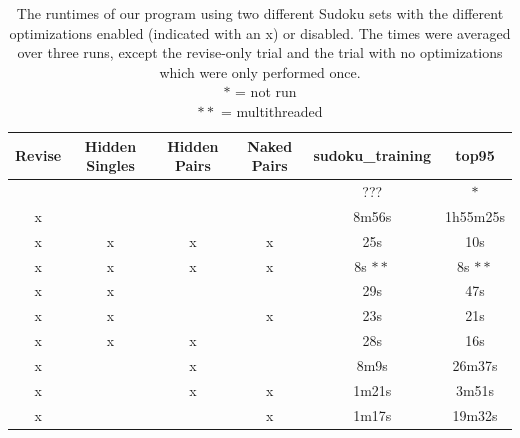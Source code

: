 \documentclass[11pt]{article} %
\begin{document}
\begin{table}[htbp]
\begin{center}
\begin{tabular}{c c c c c c}
\hline
 Revise & Hidden Singles & Hidden Pairs & Naked Pairs & sudoku\_training & top95 \\
\hline
 &  &  &  & ??? & $*$ \\ %
x &  &  &  & 8m56s & 1h55m25s \\ %
x & x & x & x & 25s & 10s \\ %
x & x & x & x & 8s $**$ & 8s $**$ \\
x & x &  &  & 29s & 47s \\ %
x & x &  & x & 23s & 21s \\ %
x & x & x &  & 28s & 16s \\ %
x &   & x &  & 8m9s & 26m37s \\ %
x &   & x & x & 1m21s & 3m51s \\ %
x &  &  & x & 1m17s & 19m32s \\ %
\hline
\end{tabular}
\end{center}
\caption{The runtimes of our program using two different Sudoku sets with the different optimizations enabled (indicated with an x) or disabled. The times were averaged over three runs, except the revise-only trial and the trial with no optimizations which were only performed once.\\ $*$ = not run \\ $**$ = multithreaded}
\label{tab:tech_results}
\end{table}
\end{document}
